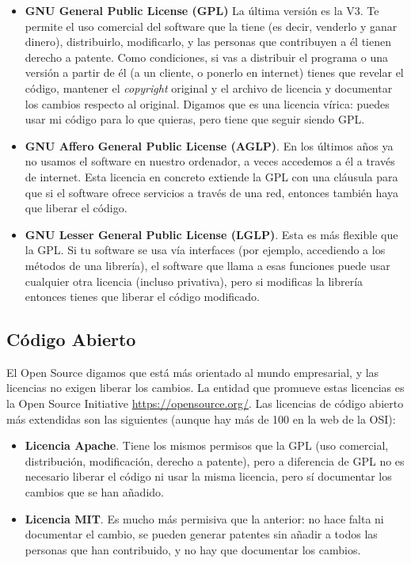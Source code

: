 \begin{itemize}

\item \textbf{GNU General Public License (GPL)} La última versión es la V3. Te permite el uso comercial del software que la tiene (es decir, venderlo y ganar dinero), distribuirlo, modificarlo, y las personas que contribuyen a él tienen derecho a patente. Como condiciones, si vas a distribuir el programa o una versión a partir de él (a un cliente, o ponerlo en internet) tienes que revelar el código, mantener el \textit{copyright} original y el archivo de licencia y documentar los cambios respecto al original. Digamos que es una licencia vírica: puedes usar mi código para lo que quieras, pero tiene que seguir siendo GPL.

\item \textbf{GNU Affero General Public License (AGLP)}. En los últimos años ya no usamos el software en nuestro ordenador, a veces accedemos a él a través de internet. Esta licencia en concreto extiende la GPL con una cláusula para que si el software ofrece servicios a través de una red, entonces también haya que liberar el código.

\item \textbf{GNU Lesser General Public License (LGLP)}. Esta es más flexible que la GPL. Si tu software se usa vía interfaces (por ejemplo, accediendo a los métodos de una librería), el software que llama a esas funciones puede usar cualquier otra licencia (incluso privativa), pero si modificas la librería entonces tienes que liberar el código modificado.

\end{itemize}

\subsection{Código Abierto}
El Open Source digamos que está más orientado al mundo empresarial, y las licencias no exigen liberar los cambios. La entidad que promueve estas licencias es la Open Source Initiative \url{https://opensource.org/}. Las licencias de código abierto más extendidas son las siguientes (aunque hay más de 100 en la web de la OSI):

\begin{itemize}
   
\item \textbf{Licencia Apache}. Tiene los mismos permisos que la GPL (uso comercial, distribución, modificación, derecho a patente), pero a diferencia de GPL no es necesario liberar el código ni usar la misma licencia, pero sí documentar los cambios que se han añadido.

\item \textbf{Licencia MIT}. Es mucho más permisiva que la anterior: no hace falta ni documentar el cambio, se pueden generar patentes sin añadir a todos las personas que han contribuido, y no hay que documentar los cambios.

\end{itemize}


